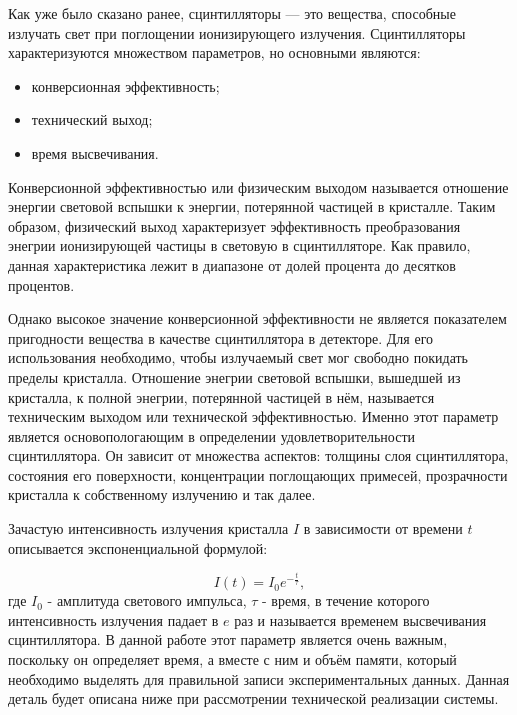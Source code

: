 Как уже было сказано ранее, сцинтилляторы --- это вещества, способные излучать свет при поглощении ионизирующего излучения. Сцинтилляторы характеризуются множеством параметров, но основными являются:
\begin{itemize}
    \item конверсионная эффективность;
    \item технический выход;
    \item время высвечивания.
\end{itemize}\par
Конверсионной эффективностью или физическим выходом называется отношение энергии световой вспышки к энергии, потерянной частицей в кристалле. Таким образом, физический выход характеризует эффективность преобразования энегрии ионизирующей частицы в световую в сцинтилляторе. Как правило, данная характеристика лежит в диапазоне от долей процента до десятков процентов.\par
Однако высокое значение конверсионной эффективности не является показателем пригодности вещества в качестве сцинтиллятора в детекторе. Для его использования необходимо, чтобы излучаемый свет мог свободно покидать пределы кристалла. Отношение энегрии световой вспышки, вышедшей из кристалла, к полной энегрии, потерянной частицей в нём, называется техническим выходом или технической эффективностью. Именно этот параметр является основопологающим в определении удовлетворительности сцинтиллятора. Он зависит от множества аспектов: толщины слоя сцинтиллятора, состояния его поверхности, концентрации поглощающих примесей, прозрачности кристалла к собственному излучению и так далее.\par
Зачастую интенсивность излучения кристалла $I$ в зависимости от времени $t$ описывается экспоненциальной формулой:\par
\begin{equation}
    I(t) = I_0 e^{-{\frac t {\tau}}},
\end{equation}
где $I_0$ - амплитуда светового импульса, $\tau$ - время, в течение которого интенсивность излучения падает в $e$ раз и называется временем высвечивания сцинтиллятора. В данной работе этот параметр является очень важным, поскольку он определяет время, а вместе с ним и объём памяти, который необходимо выделять для правильной записи экспериментальных данных. Данная деталь будет описана ниже при рассмотрении технической реализации системы.
